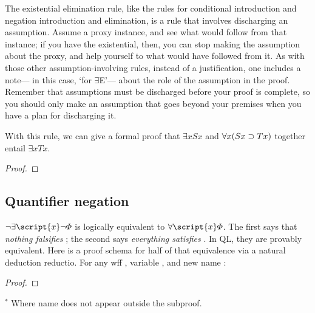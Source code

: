 The existential elimination rule, like the rules for conditional introduction and negation introduction and elimination, is a rule that involves discharging an assumption. Assume a proxy instance, and see what would follow from that instance; if you have the existential, then, you can stop making the assumption about the proxy, and help yourself to what would have followed from it. As with those other assumption-involving rules, instead of a justification, one includes a note--- in this case, `for $\exists${}E'--- about the role of the assumption in the proof. Remember that assumptions must be discharged before your proof is complete, so you should only make an assumption that goes beyond your premises when you have a plan for discharging it.


With this rule, we can give a formal proof that $\exists x Sx$ and $\forall x(Sx \supset Tx)$ together entail $\exists x Tx$.

\begin{proof}
	\open
		 
	\close
\end{proof}

\subsection{Quantifier negation}

$\enot\exists \script{x}\enot\metaA{}$ is logically equivalent to $\forall \script{x}\metaA{}$. The first says that \emph{nothing falsifies} \metaA{}; the second says \emph{everything satisfies} \metaA{}. In QL, they are provably equivalent. Here is a proof schema for half of that equivalence via a natural deduction reductio. For any wff \metaA{}, variable , and new name :


\begin{proof}
	 
	\open
		\open
			\open
			\close
		\close
	\close
\end{proof}
$^\ast$ Where name  does not appear outside the subproof.

